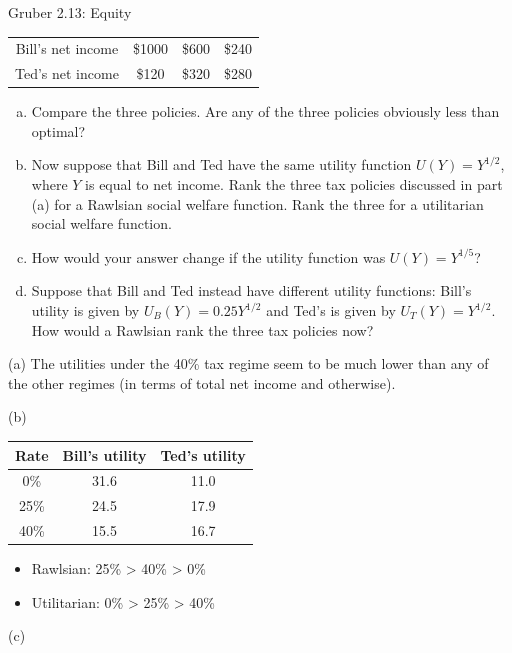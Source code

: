 \documentclass[10pt]{extarticle}
\begin{document}
{\begin{problem}{Gruber 2.13: Equity}
\begin{center}
\begin{tabular}{c|c|c|c|}
        \cline{2-4}
        Bill's net income & \$1000 & \$600 & \$240\\
        \cline{2-4}
        Ted's net income & \$120 & \$320 & \$280\\
        \cline{2-4}
      \end{tabular}
    \end{center}
    \begin{enumerate}[(a)]
      \item Compare the three policies. Are any of the three policies obviously less than optimal?
      \item Now suppose that Bill and Ted have the same utility function $U(Y) = Y^{1/2}$, where $Y$ is equal to net income. Rank the three tax policies discussed in part (a) for a Rawlsian social welfare function. Rank the three for a utilitarian social welfare function.
      \item How would your answer change if the utility function was $U(Y) = Y^{1/5}$?
      \item Suppose that Bill and Ted instead have different utility functions: Bill's utility is given by $U_B(Y) = 0.25Y^{1/2}$ and Ted's is given by $U_T(Y) = Y^{1/2}$. How would a Rawlsian rank the three tax policies now?
    \end{enumerate}
    \tcblower
    \begin{problem}{(a)}
      The utilities under the 40\% tax regime seem to be much lower than any of the other regimes (in terms of total net income and otherwise).
    \end{problem}
    \begin{problem}{(b)}
      \begin{center}
        \begin{tabular}{c|c|c}
          Rate & Bill's utility & Ted's utility\\
          \hline
          0\% & 31.6 & 11.0\\
          25\% & 24.5 & 17.9\\
          40\% & 15.5 & 16.7
        \end{tabular}
      \end{center}
      \begin{itemize}
        \item Rawlsian: 25\% > 40\% > 0\%
        \item Utilitarian: 0\% > 25\% > 40\%
      \end{itemize}
    \end{problem}
    \begin{problem}{(c)}

\end{problem}
\end{problem}}
\end{document}
